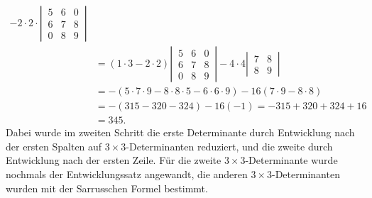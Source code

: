 \begin{loesung}
\begin{teilaufgaben}
\begin{align*}
-2\cdot2\cdot
\left|\,\begin{matrix}
5&6&0\\
6&7&8\\
0&8&9
\end{matrix}\,\right|
\\
&
=
(1\cdot 3-2\cdot 2)
\left|\,\begin{matrix}
5&6&0\\
6&7&8\\
0&8&9
\end{matrix}\,\right|
-4\cdot 4
\left|\,\begin{matrix}
7&8\\
8&9
\end{matrix}\,\right|
\\
&
=
-(5\cdot7\cdot9-8\cdot8\cdot 5-6\cdot 6\cdot 9)-16(7\cdot 9-8\cdot 8)
\\
&
=
-(315-320-324)-16(-1)=-315+320+324+16
\\
&
=345.
\end{align*}
Dabei wurde im zweiten Schritt die erste Determinante durch Entwicklung
nach der ersten Spalten auf $3\times 3$-Determinanten reduziert,
und die zweite durch Entwicklung nach der ersten Zeile. Für die
zweite $3\times 3$-Determinante wurde nochmals der Entwicklungssatz angewandt,
die anderen $3\times 3$-Determi\-nanten wurden mit der Sarrusschen Formel
bestimmt.


\end{teilaufgaben}
\end{loesung}
